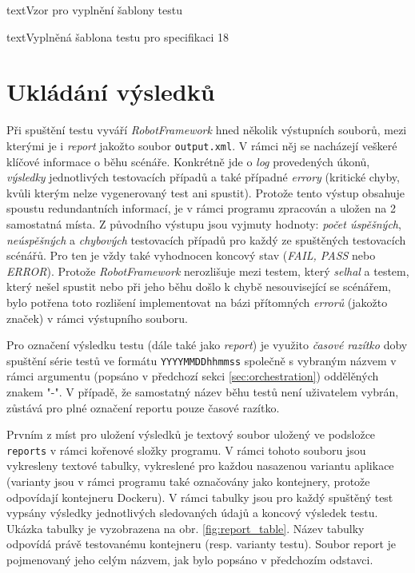 \documentclass[czech, ma, kiv, he, iso690numb, pdf, viewonly]{fasthesis}
\begin{document}
\begin{code}{text}{Vzor pro vyplnění šablony testu \label{lst:template}}
{\begin{code}{text}{Vyplněná šablona testu pro specifikaci 18 \label{lst:spec18}}
{    \section{Ukládání výsledků} \label{sec:reports}
    Při spuštění testu vyváří \textit{RobotFramework} hned několik výstupních souborů, mezi kterými je i \textit{report} jakožto soubor \verb|output.xml|. V rámci něj se nacházejí veškeré klíčové informace o běhu scénáře. Konkrétně jde o \textit{log} provedených úkonů, \textit{výsledky} jednotlivých testovacích případů a také případné \textit{errory} (kritické chyby, kvůli kterým nelze vygenerovaný test ani spustit). Protože tento výstup obsahuje spoustu redundantních informací, je v rámci programu zpracován a uložen na 2 samostatná místa. Z původního výstupu jsou vyjmuty hodnoty: \textit{počet úspěšných}, \textit{neúspěšných} a \textit{chybových} testovacích případů pro každý ze spuštěných testovacích scénářů. Pro ten je vždy také vyhodnocen koncový stav (\textit{FAIL, PASS} nebo \textit{ERROR}). Protože \textit{RobotFramework} nerozlišuje mezi testem, který \emph{selhal} a testem, který nešel spustit nebo při jeho běhu došlo k chybě nesouvisející se scénářem, bylo potřena toto rozlišení implementovat na bázi přítomných \textit{errorů} (jakožto značek) v rámci výstupního souboru. 

    Pro označení výsledku testu (dále také jako \emph{report}) je využito \textit{časové razítko} doby spuštění série testů ve formátu \verb|YYYYMMDDhhmmss| společně s vybraným názvem v rámci argumentu (popsáno v předchozí sekci \ref{sec:orchestration}) oddělěných znakem "-". V případě, že samostatný název běhu testů není uživatelem vybrán, zůstává pro plné označení reportu pouze časové razítko.

    Prvním z míst pro uložení výsledků je textový soubor uložený ve podsložce \verb|reports| v rámci kořenové složky programu. V rámci tohoto souboru jsou vykresleny textové tabulky, vykreslené pro každou nasazenou variantu aplikace (varianty jsou v rámci programu také označovány jako kontejnery, protože odpovídají kontejneru Dockeru). V rámci tabulky jsou pro každý spuštěný test vypsány výsledky jednotlivých sledovaných údajů a koncový výsledek testu. Ukázka tabulky je vyzobrazena na obr. \ref{fig:report_table}. Název tabulky odpovídá právě testovanému kontejneru (resp. varianty testu). Soubor report je pojmenovaný jeho celým názvem, jak bylo popsáno v předchozím odstavci.

}
\end{code}}
\end{code}
\end{document}
